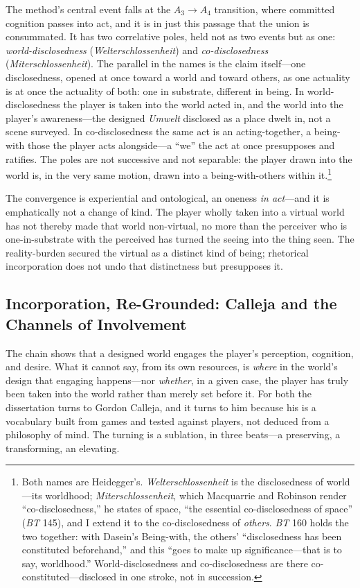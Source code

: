\documentclass{article}
\begin{document}
The method's central event falls at the $A_3 \rightarrow A_4$ transition, where committed cognition passes into act, and it is in just this passage that the union is consummated. It has two correlative poles, held not as two events but as one: \textit{world-disclosedness} (\textit{Welterschlossenheit}) and \textit{co-disclosedness} (\textit{Miterschlossenheit}). The parallel in the names is the claim itself---one disclosedness, opened at once toward a world and toward others, as one actuality is at once the actuality of both: one in substrate, different in being. In world-disclosedness the player is taken into the world acted in, and the world into the player's awareness---the designed \textit{Umwelt} disclosed as a place dwelt in, not a scene surveyed. In co-disclosedness the same act is an acting-together, a being-with those the player acts alongside---a ``we'' the act at once presupposes and ratifies. The poles are not successive and not separable: the player drawn into the world is, in the very same motion, drawn into a being-with-others within it.\footnote{Both names are Heidegger's. \textit{Welterschlossenheit} is the disclosedness of world---its worldhood; \textit{Miterschlossenheit}, which Macquarrie and Robinson render ``co-disclosedness,'' he states of space, ``the essential co-disclosedness of space'' (\textit{BT} 145), and I extend it to the co-disclosedness of \textit{others}. \textit{BT} 160 holds the two together: with Dasein's Being-with, the others' ``disclosedness has been constituted beforehand,'' and this ``goes to make up significance---that is to say, worldhood.'' World-disclosedness and co-disclosedness are there co-constituted---disclosed in one stroke, not in succession.}

The convergence is experiential and ontological, an oneness \textit{in act}---and it is emphatically not a change of kind. The player wholly taken into a virtual world has not thereby made that world non-virtual, no more than the perceiver who is one-in-substrate with the perceived has turned the seeing into the thing seen. The reality-burden secured the virtual as a distinct kind of being; rhetorical incorporation does not undo that distinctness but presupposes it.

\subsection{Incorporation, Re-Grounded: Calleja and the Channels of Involvement}

The chain shows that a designed world engages the player's perception, cognition, and desire. What it cannot say, from its own resources, is \textit{where} in the world's design that engaging happens---nor \textit{whether}, in a given case, the player has truly been taken into the world rather than merely set before it. For both the dissertation turns to Gordon Calleja, and it turns to him because his is a vocabulary built from games and tested against players, not deduced from a philosophy of mind. The turning is a sublation, in three beats---a preserving, a transforming, an elevating.
\end{document}
